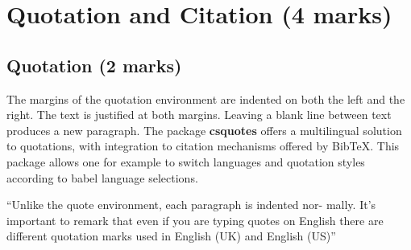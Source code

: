 \documentclass[12pt]{article}
\begin{document}
\section{Quotation and Citation (4 marks)}
\subsection{Quotation (2 marks)}
The margins of the quotation environment are indented on both the left and the
right. The text is justified at both margins. Leaving a blank line between text
produces a new paragraph. The package \textbf{csquotes} offers a multilingual solution to quotations, with integration to citation mechanisms offered by BibTeX.
This package allows one for example to switch languages and quotation styles
according to babel language selections. \newline
\begin{displayquote}
``Unlike the quote environment, each paragraph is indented nor- mally.
It’s important to remark that even if you are typing quotes on English
there are different quotation marks used in English (UK) and English
(US)''
\end{displayquote}
\end{document}
